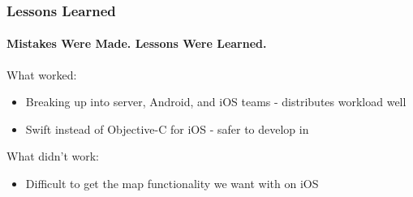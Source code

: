 \documentclass[xcolor=dvipsnames]{beamer}
\begin{document}
\begin{darkframes}
\begin{frame}
    \end{frame}


    \begin{frame}
        \frametitle{Lessons Learned}
        \framesubtitle{Mistakes Were Made. Lessons Were Learned.}

        What worked:

        \begin{itemize}
            \item Breaking up into server, Android, and iOS teams - distributes workload well
            \item Swift instead of Objective-C for iOS - safer to develop in
        \end{itemize}

        What didn't work:

        \begin{itemize}
            \item Difficult to get the map functionality we want with  on iOS
        \end{itemize}
    \end{frame}
\end{darkframes}
\end{document}
